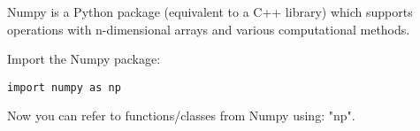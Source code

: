 Numpy is a Python package (equivalent to a C++ library) which supports operations with n-dimensional arrays and various computational methods.

Import the Numpy package:
\begin{lstlisting}
import numpy as np
\end{lstlisting}

Now you can refer to functions/classes from Numpy using: "np".
